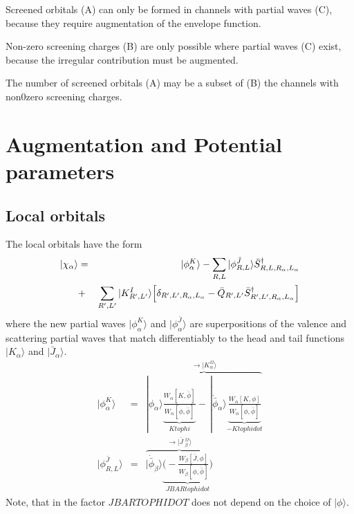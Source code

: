 \documentclass[11pt,a4paper]{report}
\begin{document}
Screened orbitals (A) can only be formed in channels with partial waves (C),
because they require augmentation of the envelope function.

Non-zero screening charges (B) are only possible where partial waves (C)
exist, because the irregular contribution must be augmented.

The number of screened orbitals (A) may be a subset of (B) the
channels with non0zero screening charges.

\section{Augmentation and Potential parameters}
\subsection{Local orbitals}
The local orbitals have the form
\begin{eqnarray}
|\chi_\alpha\rangle&=&|\phi^K_\alpha\rangle
- \sum_{R,L}|\phi^{\bar{J}}_{R,L}\rangle \bar{S}^\dagger_{R,L,R_\alpha,L_\alpha}
\nonumber\\
&+&\sum_{R',L'}|K^I_{R',L'}\rangle\Bigl[ \delta_{R',L',R_\alpha,L_\alpha}-\bar{Q}_{R',L'}
\bar{S}^\dagger_{R',L',R_\alpha,L_\alpha}\Bigr]
\end{eqnarray}
where the new partial waves $|\phi^K_\alpha\rangle$ and
$|\phi^{\bar{J}}_\alpha\rangle$ are superpositions of the valence and
scattering partial waves that match differentiably to the head and
tail functions $|K_\alpha\rangle$ and $|\bar{J}_\alpha\rangle$.
\begin{eqnarray}
|\phi^K_\alpha\rangle&=&
\overbrace{
|\phi_\alpha\rangle 
\underbrace{
\frac{W_\alpha[K,\dot{\bar{\phi}}]}{W_\alpha[\phi,\dot{\bar{\phi}}]}}_{Ktophi}
-\,|\dot{\bar{\phi}}_\alpha\rangle 
\underbrace{\frac{W_\alpha[K,\phi]}{W_\alpha[\phi,\dot{\bar{\phi}}]}}_{-Ktophidot}
}^{\rightarrow |K^\Omega_\alpha\rangle}
\nonumber\\
|\phi^{\bar{J}}_{R,L}\rangle
&=&\overbrace{
|\dot{\bar{\phi}}_\beta\rangle 
\underbrace{\biggl(-\frac{W_\beta[\bar{J},\phi]}{W_\beta[\phi,\dot{\bar{\phi}}]}\biggr)}_{JBARtophidot}
}^{\rightarrow |\bar{J}\;^\Omega_\beta\rangle}
\end{eqnarray}
Note, that in the factor $JBARTOPHIDOT$ does not depend on the choice
of $|\phi\rangle$.
\end{document}
